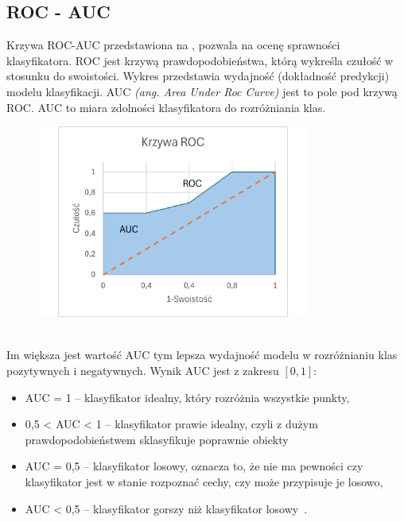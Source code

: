 \subsection{ROC - AUC}
Krzywa ROC-AUC przedstawiona na , pozwala na ocenę sprawności klasyfikatora. ROC jest krzywą prawdopodobieństwa, którą wykreśla czułość w stosunku do swoistości. Wykres przedstawia wydajność (dokładność predykcji) modelu klasyfikacji. AUC \textit{(ang. Area Under Roc Curve)} jest to pole pod krzywą ROC. AUC to miara zdolności klasyfikatora do rozróżniania klas.

\begin{figure}[H]
    \centering
    \includegraphics[width=0.8\textwidth]{images/roc-auc}
    \label{fig:roc-auc}
\end{figure}
\ \\
Im większa jest wartość AUC tym lepsza wydajność modelu w rozróżnianiu klas pozytywnych i negatywnych. Wynik AUC jest z zakresu $[0, 1]$:
\begin{itemize}
    \item AUC = 1 -- klasyfikator idealny, który rozróżnia wszystkie punkty,
    \item 0,5 < AUC < 1 -- klasyfikator prawie idealny, czyli z dużym prawdopodobieństwem sklasyfikuje poprawnie obiekty
    \item AUC = 0,5 -- klasyfikator losowy, oznacza to, że nie ma pewności czy klasyfikator jest w stanie rozpoznać cechy, czy może przypisuje je losowo,
    \item AUC < 0,5 -- klasyfikator gorszy niż klasyfikator losowy~\cite{Algolytics, Agrawal2024}.
\end{itemize}